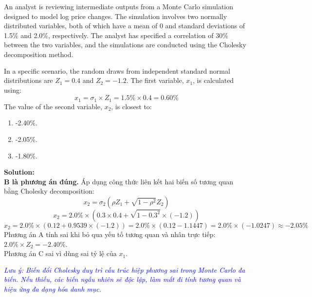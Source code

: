 \begin{tcolorbox}[
	colback=gray!5!white,
	colframe=black!15!white,
	boxrule=0.5pt,
	arc=3pt,
	title=\textbf{Knowledge Check},
	coltitle=black,
	colbacktitle=black!5!white,
	before skip=6pt,
	after skip=6pt,
	breakable
]
An analyst is reviewing intermediate outputs from a Monte Carlo simulation designed to model log price changes. The simulation involves two normally distributed variables, both of which have a mean of 0 and standard deviations of 1.5\% and 2.0\%, respectively. The analyst has specified a correlation of 30\% between the two variables, and the simulations are conducted using the Cholesky decomposition method.

In a specific scenario, the random draws from independent standard normal distributions are $Z_1 = 0.4$ and $Z_2 = -1.2$. The first variable, $x_1$, is calculated using:
\[
x_1 = \sigma_1 \times Z_1 = 1.5\% \times 0.4 = 0.60\%
\]
The value of the second variable, $x_2$, is closest to:
\begin{enumerate}[label=\Alph*.]
	\item -2.40\%.
	\item -2.05\%.
	\item -1.80\%.
\end{enumerate}

\textbf{Solution:} \\
\textbf{B là phương án đúng.} Áp dụng công thức liên kết hai biến số tương quan bằng Cholesky decomposition:
\[
x_2 = \sigma_2 \left(\rho Z_1 + \sqrt{1 - \rho^2} Z_2\right)
\]
\[
x_2 = 2.0\% \times \left(0.3 \times 0.4 + \sqrt{1 - 0.3^2} \times (-1.2)\right)
\]
\[
x_2 = 2.0\% \times \left(0.12 + 0.9539 \times (-1.2)\right) = 2.0\% \times (0.12 - 1.1447) = 2.0\% \times (-1.0247) \approx -2.05\%
\]
Phương án A tính sai khi bỏ qua yếu tố tương quan và nhân trực tiếp: $2.0\% \times Z_2 = -2.40\%$. \\
Phương án C sai vì dùng sai tỷ lệ của $x_1$.
\end{tcolorbox}

\textcolor{blue}{\textit{Lưu ý: Biến đổi Cholesky duy trì cấu trúc hiệp phương sai trong Monte Carlo đa biến. Nếu thiếu, các biến ngẫu nhiên sẽ độc lập, làm mất đi tính tương quan và hiệu ứng đa dạng hóa danh mục.}}

